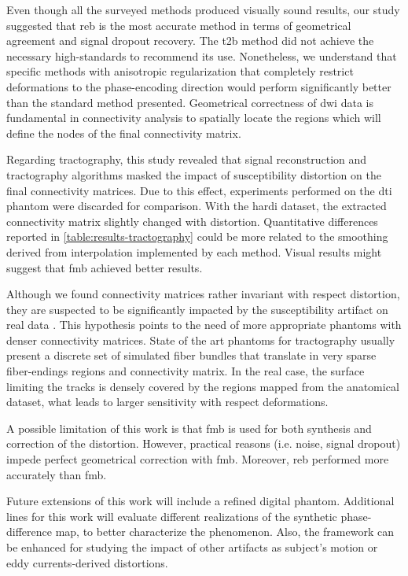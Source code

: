 Even though all the surveyed methods produced visually 
sound results, our study suggested that \gls*{reb} is the 
most accurate method in terms of geometrical agreement and
signal dropout recovery. 
The \gls*{t2b} method did not achieve the necessary high-standards
to recommend its use. Nonetheless, we understand that specific
methods with anisotropic regularization that completely
restrict deformations to the phase-encoding direction would perform
significantly better than the standard method presented.
Geometrical correctness of \gls*{dwi} data is fundamental 
in connectivity analysis to spatially locate the
regions which will define the nodes of the final connectivity
matrix.

Regarding tractography, this study revealed that signal
reconstruction and tractography algorithms masked the 
impact of susceptibility distortion on the final connectivity
matrices. Due to this effect, experiments performed on 
the \gls*{dti} phantom were discarded for comparison.
With the \gls*{hardi} dataset, the extracted 
connectivity matrix slightly
changed with distortion. Quantitative differences reported in
\autoref{table:results-tractography} could be more related
to the smoothing derived from interpolation implemented by
each method. Visual results might suggest that \gls*{fmb}
achieved better results.

Although we found connectivity matrices rather invariant with
respect distortion, they are suspected to be significantly
impacted by the susceptibility artifact on real data 
\cite{irfanoglu_effects_2012}.
This hypothesis points to the need of more appropriate 
phantoms with denser connectivity matrices.
State of the art phantoms for tractography usually present a
discrete set of simulated fiber bundles that translate in 
very sparse fiber-endings regions and connectivity matrix.
In the real case, the surface limiting the tracks is densely 
covered by the regions mapped from the anatomical 
dataset, what leads to larger sensitivity with respect 
deformations.

A possible limitation of this work is that \gls*{fmb} is
used for both synthesis and correction of the distortion.
However, practical reasons (i.e. noise, signal dropout)
impede perfect geometrical correction with \gls*{fmb}.
Moreover, \gls*{reb} performed more accurately 
than \gls*{fmb}.

Future extensions of this work will include a 
refined digital phantom. Additional lines for this
work will evaluate different realizations of the 
synthetic phase-difference map, to better characterize
the phenomenon. Also, the framework can be enhanced 
for studying the impact of other artifacts as 
subject's motion or eddy currents-derived distortions.